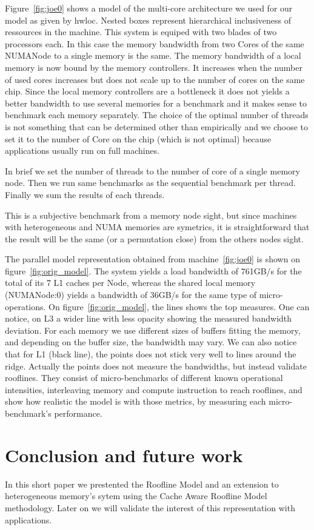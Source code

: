 \documentclass[twoside,twocolumn,8pt]{extarticle}
\begin{document}
Figure~\ref{fig:joe0} shows a model of the multi-core architecture we used for our model as given by hwloc.
Nested boxes represent hierarchical inclusiveness of ressources in the machine.
This system is equiped with two blades of two processors each.
In this case the memory bandwidth from two Cores of the same NUMANode to a single memory is the same.
The memory bandwidth of a local memory is now bound by the memory controllers.
It increases when the number of used cores increases but does not scale up to the number of cores on the same chip.
Since the local memory controllers are a bottleneck it does not yields a better bandwidth to use several memories for a
benchmark and it makes sense to benchmark each memory separately.
The choice of the optimal number of threads is not something that can be determined other than empirically and we choose to
set it to the number of Core on the chip (which is not optimal) because applications usually run on full machines.

In brief we set the number of threads to the number of core of a single memory node. Then we run same benchmarks as the sequential
benchmark per thread. Finally we sum the results of each threads.

This is a subjective benchmark from a memory node sight, but since machines with heterogeneous and NUMA memories are symetrics,
it is straightforward that the result will be the same (or a permutation close) from the others nodes sight.

The parallel model representation obtained from machine~\ref{fig:joe0} is shown on figure~\ref{fig:orig_model}.
The system yields a load bandwidth of 761GB/s for the total of its 7 L1 caches per Node, whereas the shared local memory
(NUMANode:0) yields a bandwidth of 36GB/s for the same type of micro-operations.
On figure~\ref{fig:orig_model}, the lines shows the top measures.
One can notice, on L3 a wider line with less opacity showing the measured bandwidth deviation.
For each memory we use different sizes of buffers fitting the memory, and depending on the buffer size, the bandwidth may vary.
We can also notice that for L1 (black line), the points does not stick very well to lines around the ridge. Actually the points
does not measure the bandwidths, but instead validate rooflines. They consist of micro-benchmarks of different known operational
intensities, interleaving memory and compute instruction to reach rooflines, and show how realistic the model is with those
metrics, by measuring each micro-benchmark's performance.

\section{Conclusion and future work}\label{sec:conclusion}
In this short paper we prestented the Roofline Model and an extension to heterogeneous memory's sytem using the Cache Aware
Roofline Model methodology. Later on we will validate the interest of this representation with applications. 



\end{document}
